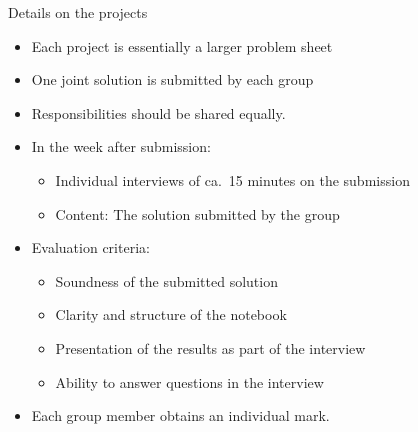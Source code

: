 \begin{frame}{Details on the projects}
    \smaller
    \begin{itemize}
        \item Each project is essentially a larger problem sheet
        \item One joint solution is submitted by each group
        \item Responsibilities should be shared equally.
        \vspace{0.5em}
        \item In the week after submission:
            \begin{itemize}
                \smaller
                \item Individual interviews of ca.~15 minutes on the submission
                \item \alert{Content:} The solution submitted by the group
            \end{itemize}
        \vspace{0.5em}
        \item Evaluation criteria:
            \begin{itemize}
                \smaller
                \item Soundness of the submitted solution
                \item Clarity and structure of the notebook
                \item Presentation of the results as part of the interview
                \item Ability to answer questions in the interview
            \end{itemize}
        \vspace{0.5em}
        \item Each group member obtains an \alert{individual} mark.
    \end{itemize}
\end{frame}

